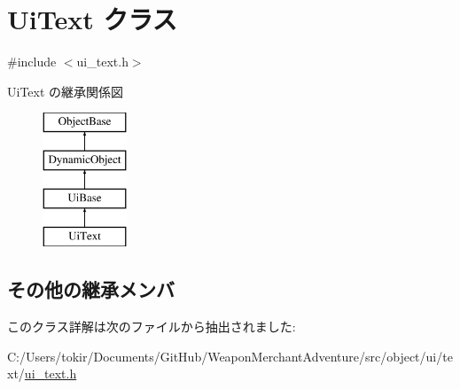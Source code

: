 \hypertarget{class_ui_text}{}\section{Ui\+Text クラス}
\label{class_ui_text}


{\ttfamily \#include $<$ui\+\_\+text.\+h$>$}

Ui\+Text の継承関係図\begin{figure}[H]
\begin{center}
\leavevmode
\includegraphics[height=4.000000cm]{class_ui_text}
\end{center}
\end{figure}
\subsection*{その他の継承メンバ}


このクラス詳解は次のファイルから抽出されました\+:\begin{DoxyCompactItemize}
\item 
C\+:/\+Users/tokir/\+Documents/\+Git\+Hub/\+Weapon\+Merchant\+Adventure/src/object/ui/text/\mbox{\hyperlink{ui__text_8h}{ui\+\_\+text.\+h}}\end{DoxyCompactItemize}
